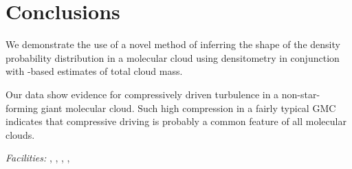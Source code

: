 \section{Conclusions}
We demonstrate the use of a novel method of inferring the shape of the density
probability distribution in a molecular cloud using \formaldehyde densitometry
in conjunction with \thirteenco-based estimates of total cloud mass.

Our data show evidence for compressively driven turbulence in a
non-star-forming giant molecular cloud.  Such high compression in a fairly
typical GMC indicates that compressive driving is probably a common feature of
all molecular clouds.

% 
% 
% 
% 

{\it Facilities:} , , ,
, 



